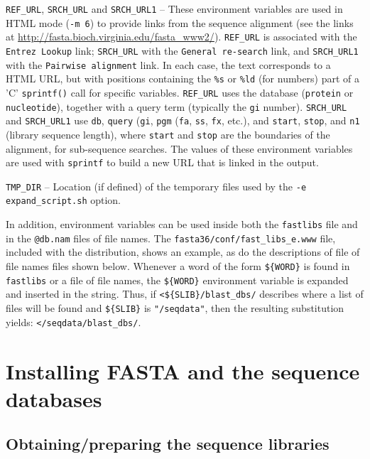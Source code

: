 \documentclass[11pt]{article}
\begin{document}
\texttt{REF\_URL}, \texttt{SRCH\_URL} and \texttt{SRCH\_URL1} -- These
environment variables are used in HTML mode (\texttt{-m 6}) to provide
links from the sequence alignment (see the links at
\url{http://fasta.bioch.virginia.edu/fasta_www2/}). \texttt{REF\_URL}
is associated with the \texttt{Entrez Lookup} link; \texttt{SRCH\_URL}
with the \texttt{General re-search} link, and \texttt{SRCH\_URL1}
with the \texttt{Pairwise alignment} link.  In each case, the text
corresponds to a HTML URL, but with positions containing the
\texttt{\%s} or \texttt{\%ld} (for numbers) part of a 'C'
\texttt{sprintf()} call for specific variables. \texttt{REF\_URL} uses
the database (\texttt{protein} or \texttt{nucleotide}), together with
a query term (typically the \texttt{gi} number). \texttt{SRCH\_URL}
and \texttt{SRCH\_URL1} use \texttt{db}, \texttt{query} (\texttt{gi},
\texttt{pgm} (\texttt{fa}, \texttt{ss}, \texttt{fx}, etc.), and
\texttt{start}, \texttt{stop}, and \texttt{n1} (library sequence
length), where \texttt{start} and \texttt{stop} are the boundaries of
the alignment, for sub-sequence searches.  The values of these
environment variables are used with \texttt{sprintf} to build a new
URL that is linked in the output.

\texttt{TMP\_DIR} -- Location (if defined) of the temporary files used
by the \texttt{-e expand\_script.sh} option.

In addition, environment variables can be used inside both the
\texttt{fastlibs} file and in the \texttt{@db.nam} files of file
names. The \texttt{fasta36/conf/fast\_libs\_e.www} file, included with
the distribution, shows an example, as do the descriptions of file of
file names files shown below. Whenever a word of the form
\texttt{\$\{WORD\}} is found in \texttt{fastlibs} or a file of file
names, the \texttt{\$\{WORD\}} environment variable is expanded and
inserted in the string.  Thus, if \texttt{<\$\{SLIB\}/blast\_dbs/}
describes where a list of files will be found and \texttt{\$\{SLIB\}}
is \texttt{"/seqdata"}, then the resulting substitution yields:
\texttt{</seqdata/blast\_dbs/}.

\section{Installing FASTA and the sequence databases}

\subsection{Obtaining/preparing the sequence libraries}
\end{document}
